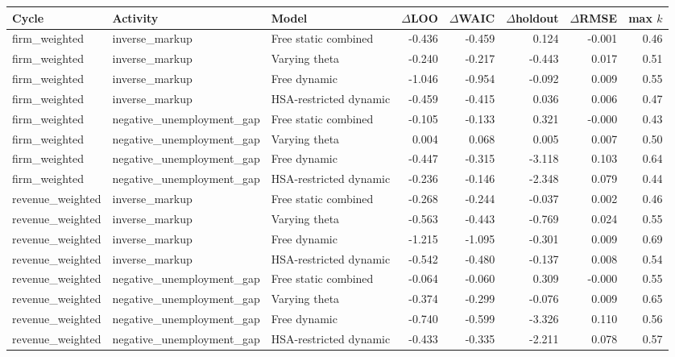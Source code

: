 \begin{tabular}{@{}lllrrrrr@{}}
\toprule
Cycle & Activity & Model & $\Delta$LOO & $\Delta$WAIC & $\Delta$holdout & $\Delta$RMSE & max $k$ \\
\midrule
firm\_weighted & inverse\_markup & Free static combined & -0.436 & -0.459 & 0.124 & -0.001 & 0.46 \\
firm\_weighted & inverse\_markup & Varying theta & -0.240 & -0.217 & -0.443 & 0.017 & 0.51 \\
firm\_weighted & inverse\_markup & Free dynamic & -1.046 & -0.954 & -0.092 & 0.009 & 0.55 \\
firm\_weighted & inverse\_markup & HSA-restricted dynamic & -0.459 & -0.415 & 0.036 & 0.006 & 0.47 \\
firm\_weighted & negative\_unemployment\_gap & Free static combined & -0.105 & -0.133 & 0.321 & -0.000 & 0.43 \\
firm\_weighted & negative\_unemployment\_gap & Varying theta & 0.004 & 0.068 & 0.005 & 0.007 & 0.50 \\
firm\_weighted & negative\_unemployment\_gap & Free dynamic & -0.447 & -0.315 & -3.118 & 0.103 & 0.64 \\
firm\_weighted & negative\_unemployment\_gap & HSA-restricted dynamic & -0.236 & -0.146 & -2.348 & 0.079 & 0.44 \\
revenue\_weighted & inverse\_markup & Free static combined & -0.268 & -0.244 & -0.037 & 0.002 & 0.46 \\
revenue\_weighted & inverse\_markup & Varying theta & -0.563 & -0.443 & -0.769 & 0.024 & 0.55 \\
revenue\_weighted & inverse\_markup & Free dynamic & -1.215 & -1.095 & -0.301 & 0.009 & 0.69 \\
revenue\_weighted & inverse\_markup & HSA-restricted dynamic & -0.542 & -0.480 & -0.137 & 0.008 & 0.54 \\
revenue\_weighted & negative\_unemployment\_gap & Free static combined & -0.064 & -0.060 & 0.309 & -0.000 & 0.55 \\
revenue\_weighted & negative\_unemployment\_gap & Varying theta & -0.374 & -0.299 & -0.076 & 0.009 & 0.65 \\
revenue\_weighted & negative\_unemployment\_gap & Free dynamic & -0.740 & -0.599 & -3.326 & 0.110 & 0.56 \\
revenue\_weighted & negative\_unemployment\_gap & HSA-restricted dynamic & -0.433 & -0.335 & -2.211 & 0.078 & 0.57 \\
\bottomrule
\end{tabular}
